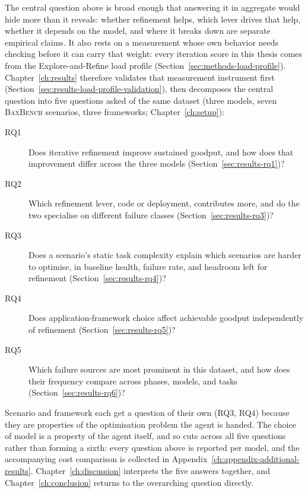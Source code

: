 The central question above is broad enough that answering it in aggregate
would hide more than it reveals: whether refinement helps, which lever drives
that help, whether it depends on the model, and where it breaks down are
separate empirical claims. It also rests on a measurement whose own behavior
needs checking before it can carry that weight: every iteration score in this
thesis comes from the Explore-and-Refine load profile
(Section~\ref{sec:methods-load-profile}). Chapter~\ref{ch:results} therefore
validates that measurement instrument first
(Section~\ref{sec:results-load-profile-validation}), then decomposes the
central question into five questions asked of the same dataset (three models,
seven \textsc{BaxBench} scenarios, three frameworks;
Chapter~\ref{ch:setup}):
%
\begin{description}
  \item[RQ1] Does iterative refinement improve sustained goodput, and how
    does that improvement differ across the three models
    (Section~\ref{sec:results-rq1})?
  \item[RQ2] Which refinement lever, code or deployment, contributes more,
    and do the two specialise on different failure classes
    (Section~\ref{sec:results-rq3})?
  \item[RQ3] Does a scenario's static task complexity explain which
    scenarios are harder to optimise, in baseline health, failure rate, and
    headroom left for refinement (Section~\ref{sec:results-rq4})?
  \item[RQ4] Does application-framework choice affect achievable goodput
    independently of refinement (Section~\ref{sec:results-rq5})?
  \item[RQ5] Which failure sources are most prominent in this dataset, and
    how does their frequency compare across phases, models, and tasks
    (Section~\ref{sec:results-rq6})?
\end{description}
%
Scenario and framework each get a question of their own (RQ3, RQ4) because
they are properties of the optimisation problem the agent is handed. The
choice of model is a property of the agent itself, and so cuts across all
five questions rather than forming a sixth: every question above is reported
per model, and the accompanying cost comparison is collected in
Appendix~\ref{ch:appendix-additional-results}.
Chapter~\ref{ch:discussion} interprets the five answers together, and
Chapter~\ref{ch:conclusion} returns to the overarching question directly.


